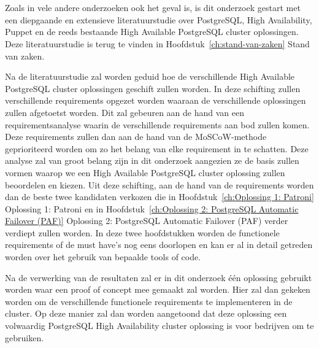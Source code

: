 
\chapter{}
\label{ch:methodologie}


Zoals in vele andere onderzoeken ook het geval is, is dit onderzoek gestart met een diepgaande en extensieve literatuurstudie over PostgreSQL, High Availability, Puppet en de reeds bestaande High Available PostgreSQL cluster oplossingen. Deze literatuurstudie is terug te vinden in Hoofdstuk~\ref{ch:stand-van-zaken} Stand van zaken.

Na de literatuurstudie zal worden geduid hoe de verschillende High Available PostgreSQL cluster oplossingen geschift zullen worden. In deze schifting zullen verschillende requirements opgezet worden waaraan de verschillende oplossingen zullen afgetoetst worden. Dit zal gebeuren aan de hand van een requirementsanalyse waarin de verschillende requirements aan bod zullen komen. Deze requirements zullen dan aan de hand van de MoSCoW-methode geprioriteerd worden om zo het belang van elke requirement in te schatten. Deze analyse zal van groot belang zijn in dit onderzoek aangezien ze de basis zullen vormen waarop we een High Available PostgreSQL cluster oplossing zullen beoordelen en kiezen.
Uit deze schifting, aan de hand van de requirements worden dan de beste twee kandidaten verkozen die in Hoofdstuk~\ref{ch:Oplossing 1: Patroni} Oplossing 1: Patroni en in Hoofdstuk~\ref{ch:Oplossing 2: PostgreSQL Automatic Failover (PAF)} Oplossing 2: PostgreSQL Automatic Failover (PAF) verder verdiept zullen worden. In deze twee hoofdstukken worden de functionele requirements of de must have's nog eens doorlopen en kan er al in detail getreden worden over het gebruik van bepaalde tools of code.


Na de verwerking van de resultaten zal er in dit onderzoek één oplossing gebruikt worden waar een proof of concept mee gemaakt zal worden. Hier zal dan gekeken worden om de verschillende functionele requirements te implementeren in de cluster. Op deze manier zal dan worden aangetoond dat deze oplossing een volwaardig PostgreSQL High Availability cluster oplossing is voor bedrijven om te gebruiken.%

